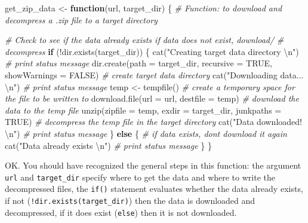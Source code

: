 \documentclass[
]{article}
\newenvironment{Shaded}{\begin{snugshade}}{\end{snugshade}}
\newcommand{\AttributeTok}[1]{\textcolor[rgb]{0.77,0.63,0.00}{#1}}
\newcommand{\CommentTok}[1]{\textcolor[rgb]{0.56,0.35,0.01}{\textit{#1}}}
\newcommand{\ConstantTok}[1]{\textcolor[rgb]{0.00,0.00,0.00}{#1}}
\newcommand{\ControlFlowTok}[1]{\textcolor[rgb]{0.13,0.29,0.53}{\textbf{#1}}}
\newcommand{\FunctionTok}[1]{\textcolor[rgb]{0.00,0.00,0.00}{#1}}
\newcommand{\NormalTok}[1]{#1}
\newcommand{\OtherTok}[1]{\textcolor[rgb]{0.56,0.35,0.01}{#1}}
\newcommand{\SpecialCharTok}[1]{\textcolor[rgb]{0.00,0.00,0.00}{#1}}
\newcommand{\StringTok}[1]{\textcolor[rgb]{0.31,0.60,0.02}{#1}}
\begin{document}
\begin{Shaded}
\begin{Highlighting}[]
\NormalTok{get\_zip\_data }\OtherTok{\textless{}{-}} \ControlFlowTok{function}\NormalTok{(url, target\_dir) \{}
    \CommentTok{\# Function: to download and decompress a .zip file to a target directory}

    \CommentTok{\# Check to see if the data already exists if data does not exist, download/}
    \CommentTok{\# decompress}
    \ControlFlowTok{if}\NormalTok{ (}\SpecialCharTok{!}\FunctionTok{dir.exists}\NormalTok{(target\_dir)) \{}
        \FunctionTok{cat}\NormalTok{(}\StringTok{"Creating target data directory }\SpecialCharTok{\textbackslash{}n}\StringTok{"}\NormalTok{)  }\CommentTok{\# print status message}
        \FunctionTok{dir.create}\NormalTok{(}\AttributeTok{path =}\NormalTok{ target\_dir, }\AttributeTok{recursive =} \ConstantTok{TRUE}\NormalTok{, }\AttributeTok{showWarnings =} \ConstantTok{FALSE}\NormalTok{)  }\CommentTok{\# create target data directory}
        \FunctionTok{cat}\NormalTok{(}\StringTok{"Downloading data... }\SpecialCharTok{\textbackslash{}n}\StringTok{"}\NormalTok{)  }\CommentTok{\# print status message}
\NormalTok{        temp }\OtherTok{\textless{}{-}} \FunctionTok{tempfile}\NormalTok{()  }\CommentTok{\# create a temporary space for the file to be written to}
        \FunctionTok{download.file}\NormalTok{(}\AttributeTok{url =}\NormalTok{ url, }\AttributeTok{destfile =}\NormalTok{ temp)  }\CommentTok{\# download the data to the temp file}
        \FunctionTok{unzip}\NormalTok{(}\AttributeTok{zipfile =}\NormalTok{ temp, }\AttributeTok{exdir =}\NormalTok{ target\_dir, }\AttributeTok{junkpaths =} \ConstantTok{TRUE}\NormalTok{)  }\CommentTok{\# decompress the temp file in the target directory}
        \FunctionTok{cat}\NormalTok{(}\StringTok{"Data downloaded! }\SpecialCharTok{\textbackslash{}n}\StringTok{"}\NormalTok{)  }\CommentTok{\# print status message}
\NormalTok{    \} }\ControlFlowTok{else}\NormalTok{ \{}
        \CommentTok{\# if data exists, don\textquotesingle{}t download it again}
        \FunctionTok{cat}\NormalTok{(}\StringTok{"Data already exists }\SpecialCharTok{\textbackslash{}n}\StringTok{"}\NormalTok{)  }\CommentTok{\# print status message}
\NormalTok{    \}}
\NormalTok{\}}
\end{Highlighting}
\end{Shaded}

OK. You should have recognized the general steps in this function: the argument \texttt{url} and \texttt{target\_dir} specify where to get the data and where to write the decompressed files, the \texttt{if()} statement evaluates whether the data already exists, if not (\texttt{!dir.exists(target\_dir)}) then the data is downloaded and decompressed, if it does exist (\texttt{else}) then it is not downloaded.
\end{document}
